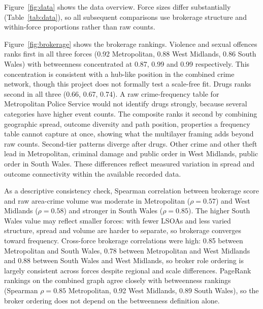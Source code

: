 \documentclass[conference,a4paper]{IEEEtran}
\begin{document}
Figure~\ref{fig:data} shows the data overview.
Force sizes differ substantially (Table~\ref{tab:data}), so all
subsequent comparisons use brokerage structure and within-force
proportions rather than raw counts.

Figure~\ref{fig:brokerage} shows the brokerage rankings.
Violence and sexual offences ranks first in all three forces (0.92
Metropolitan, 0.88 West Midlands, 0.86 South Wales) with betweenness
concentrated at 0.87, 0.99 and 0.99 respectively.
This concentration is consistent with a hub-like position in the
combined crime network, though this project does not formally test a
scale-free fit.
Drugs ranks second in all three (0.66, 0.67, 0.74).
A raw crime-frequency table for Metropolitan Police Service would not identify
drugs strongly, because several categories have higher event counts.
The composite ranks it second by combining geographic spread, outcome
diversity and path position, properties a frequency table cannot
capture at once, showing what the multilayer framing adds beyond raw
counts.
Second-tier patterns diverge after drugs.
Other crime and other theft lead in Metropolitan, criminal damage and
public order in West Midlands, public order in South Wales.
These differences reflect measured variation in spread and outcome connectivity within the available recorded data.

As a descriptive consistency check, Spearman correlation between brokerage
score and raw area-crime volume was moderate in Metropolitan
($\rho{=}0.57$) and West Midlands ($\rho{=}0.58$) and stronger in
South Wales ($\rho{=}0.85$).
The higher South Wales value may reflect smaller forces: with fewer
LSOAs and less varied structure, spread and volume are harder to
separate, so brokerage converges toward frequency.
Cross-force brokerage correlations were high: 0.85 between Metropolitan
and South Wales, 0.78 between Metropolitan and West Midlands and 0.88
between South Wales and West Midlands, so broker role ordering is
largely consistent across forces despite regional and scale
differences.
PageRank rankings on the combined graph agree closely with betweenness
rankings (Spearman $\rho{=}0.85$ Metropolitan, 0.92 West Midlands, 0.89
South Wales), so the broker ordering does not
depend on the betweenness definition alone.
\end{document}
